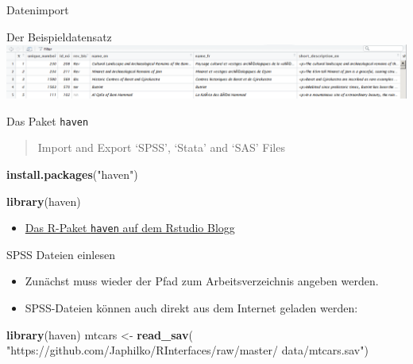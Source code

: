 \documentclass[ignorenonframetext,]{beamer}
\newenvironment{Shaded}{}{}
\newcommand{\KeywordTok}[1]{\textcolor[rgb]{0.00,0.44,0.13}{\textbf{{#1}}}}
\newcommand{\StringTok}[1]{\textcolor[rgb]{0.25,0.44,0.63}{{#1}}}
\newcommand{\NormalTok}[1]{{#1}}
\providecommand{\tightlist}{%
\setlength{\itemsep}{0pt}\setlength{\parskip}{0pt}}
\begin{document}
\begin{frame}[fragile]{Datenimport}
\begin{block}{Der Beispieldatensatz}
\includegraphics{./tex2pdf.9796/2660e2345e9e67c6183dba09dc92fe1b26a231dc.png}

\end{block}

\begin{block}{Das Paket \texttt{haven}}

\begin{quote}
Import and Export `SPSS', `Stata' and `SAS' Files
\end{quote}

\begin{Shaded}
\begin{Highlighting}[]
\KeywordTok{install.packages}\NormalTok{(}\StringTok{"haven"}\NormalTok{)}
\end{Highlighting}
\end{Shaded}

\begin{Shaded}
\begin{Highlighting}[]
\KeywordTok{library}\NormalTok{(haven)}
\end{Highlighting}
\end{Shaded}

\begin{itemize}
\tightlist
\item
  \href{https://blog.rstudio.org/2016/10/04/haven-1-0-0/}{Das R-Paket
  \texttt{haven} auf dem Rstudio Blogg}
\end{itemize}

\end{block}

\begin{block}{SPSS Dateien einlesen}

\begin{itemize}
\tightlist
\item
  Zunächst muss wieder der Pfad zum Arbeitsverzeichnis angeben werden.
\item
  SPSS-Dateien können auch direkt aus dem Internet geladen werden:
\end{itemize}

\begin{Shaded}
\begin{Highlighting}[]
\KeywordTok{library}\NormalTok{(haven)}
\NormalTok{mtcars <-}\StringTok{ }\KeywordTok{read_sav}\NormalTok{(}
\StringTok{"https://github.com/Japhilko/RInterfaces/raw/master/}
\StringTok{data/mtcars.sav"}\NormalTok{)}
\end{Highlighting}
\end{Shaded}


\end{block}
\end{frame}
\end{document}

